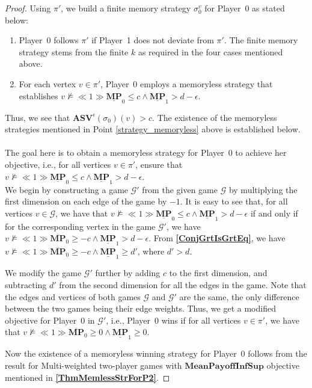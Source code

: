 \begin{proof}
Using $\pi'$, we build a finite memory strategy $\sigma_0^v$ for Player~0 as stated below:
\begin{enumerate}
    \item Player~0 follows $\pi'$ if Player~1 does not deviate from $\pi'$. The finite memory strategy stems from the finite $k$ as required in the four cases mentioned above.
    \item \label{strategy_memoryless} For each vertex $v \in \pi'$, Player~0 employs a memoryless strategy that establishes $v \nvDash \ll 1 \gg \underline{\mathbf{MP}}_0 \leqslant c \land \underline{\mathbf{MP}}_1 > d-\epsilon$.
\end{enumerate}
Thus, we see that $\mathbf{ASV}^{\epsilon}(\sigma_0)(v) > c$.
The existence of the memoryless strategies mentioned in Point \ref{strategy_memoryless} above is established below. \\ \\ \noindent
The goal here is to obtain a memoryless strategy for Player~0 to achieve her objective, i.e., for all vertices $v \in \pi'$, ensure that $v \nvDash \ll 1 \gg \underline{\mathbf{MP}}_0 \leqslant c \land \underline{\mathbf{MP}}_1 > d-\epsilon$. \\ \noindent
We begin by constructing a game $\mathcal{G'}$ from the given game $\mathcal{G}$ by multiplying the first dimension on each edge of the game by $-1$. It is easy to see that, for all vertices $v \in \mathcal{G}$, we have that $v \nvDash \ll 1 \gg \underline{\mathbf{MP}}_0 \leqslant c \land \underline{\mathbf{MP}}_1 > d-\epsilon$ if and only if for the corresponding vertex in the game $\mathcal{G'}$, we have $v \nvDash \ll 1 \gg \overline{\mathbf{MP}}_0 \geqslant -c \land \underline{\mathbf{MP}}_1 > d-\epsilon$.
From \textbf{\cref{ConjGrtIsGrtEq}}, we have $v \nvDash \ll 1 \gg \overline{\mathbf{MP}}_0 \geqslant -c \land \underline{\mathbf{MP}}_1 \geqslant d'$, where $d' > d$.

We modify the game $\mathcal{G'}$ further by adding $c$ to the first dimension, and subtracting $d'$ from the second dimension for all the edges in the game. Note that the edges and vertices of both games $\mathcal{G}$ and $\mathcal{G'}$ are the same, the only difference between the two games being their edge weights. Thus, we get a modified objective for Player~0 in $\mathcal{G'}$, i.e., Player~0 wins if for all vertices $v \in \pi'$, we have that $v \nvDash \ll 1 \gg \overline{\mathbf{MP}}_0 \geqslant 0 \land \underline{\mathbf{MP}}_1 \geqslant 0$.

Now the existence of a memoryless winning strategy for Player~0 follows from the result for Multi-weighted two-player games with $\mathbf{MeanPayoffInfSup}$ objective \cite{VCDHRR15} mentioned in \textbf{\cref{ThmMemlessStrForP2}}.


\end{proof}
